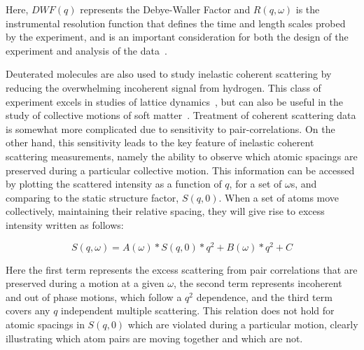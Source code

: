 \documentclass[8.5pt,twoside,twocolumn]{article}
\begin{document}
Here, $DWF(q)$ represents the Debye-Waller Factor and $R(q, \omega)$ is the instrumental resolution function that defines the time and length scales probed by the experiment, and is an important consideration for both the design of the experiment and analysis of the data~\cite{Nickels.2012b}. 

Deuterated molecules are also used to study inelastic coherent scattering by reducing the overwhelming incoherent signal from hydrogen. This class of experiment excels in studies of lattice dynamics~\cite{Copley.1974,Nielsen.1973}, but can also be useful in the study of collective motions of soft matter~\cite{Buchenau.1986,Carpenter.1985,Nickels.2013,Neumann.1991,Rheinstadter.2004}. Treatment of coherent scattering data is somewhat more complicated due to sensitivity to pair-correlations. On the other hand, this sensitivity leads to the key feature of inelastic coherent scattering measurements, namely the ability to observe which atomic spacings are preserved during a particular collective motion. This information can be accessed by plotting the scattered intensity as a function of $q$, for a set of $\omega$s, and comparing to the static structure factor, $S(q,0)$. When a set of atoms move collectively, maintaining their relative spacing, they will give rise to excess intensity written as follows: 

\begin{equation}
\label{eq:Jon6}
S(q,\omega)= A(\omega) \ast  S(q,0) \ast q^2 + B(\omega) \ast q^2 + C 
\end{equation}

Here the first term represents the excess scattering from pair correlations that are preserved during a motion at a given $\omega$, the second term represents incoherent and out of phase motions, which follow a $q^2$ dependence, and the third term covers any $q$ independent multiple scattering. This relation does not hold for atomic spacings in $S(q,0)$ which are violated during a particular motion, clearly illustrating which atom pairs are moving together and which are not. 
\end{document}

